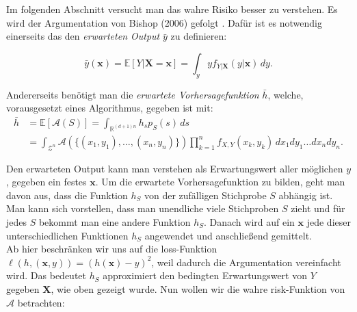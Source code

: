 Im folgenden Abschnitt versucht man das wahre Risiko besser zu verstehen. Es wird der Argumentation von Bishop (2006) gefolgt \cite[Seiten 147 bis 152]{bishop}.
Daf\"ur ist es notwendig einerseits das den \textit{erwarteten Output} $\bar{y}$ zu definieren:

$$ \bar{y}(\mathbf{x}) = \mathbb{E}[Y|\mathbf{X}=\mathbf{x}] = \int_y y f_{Y|\mathbf{X}}(y|\mathbf{x}) \, dy.$$

Andererseits ben\"otigt man die \textit{erwartete Vorhersagefunktion} $\bar{h}$, welche, vorausgesetzt eines Algorithmus, gegeben ist mit:
\begin{equation*}
	\begin{split}
		\bar{h} & = \mathbb{E}[\mathcal{A}(S)] = \int_{\mathbb{R}^{(d+1)n}} h_s p_S(s)  \,ds  \\\
		& = \int_{\mathcal{Z}^n}\mathcal{A}(\{ (x_1, y_1), \dots ,(x_n, y_n)\}) \prod_{k=1}^n f_{X,Y}(x_k, y_k) \, dx_1 dy_1 \dots dx_n dy_n.
	\end{split}
\end{equation*}


Den erwarteten Output kann man verstehen als Erwartungswert aller m\"oglichen $y$, gegeben ein festes $\mathbf{x}$.
Um die erwartete Vorhersagefunktion zu bilden, geht man davon aus, dass
die Funktion $h_S$ von der zuf\"alligen Stichprobe $S$ abh\"angig ist. Man kann sich vorstellen, dass man unendliche viele Stichproben $S$ zieht und
f\"ur jedes $S$ bekommt man eine andere Funktion $h_S$. Danach wird auf ein $\mathbf{x}$ jede dieser unterschiedlichen Funktionen $h_S$ angewendet und
anschlie{\ss}end gemittelt. \\


Ab hier beschr\"anken wir uns auf die loss-Funktion $ \ell(h, (\mathbf{x},y)) = (h(\mathbf{x}) - y)^2 $, weil dadurch die Argumentation vereinfacht wird.
Das bedeutet $h_S$ approximiert den bedingten Erwartungswert von
$Y$ gegeben $\mathbf{X}$, wie oben gezeigt wurde. Nun wollen wir die wahre risk-Funktion von $\mathcal{A}$ betrachten:

